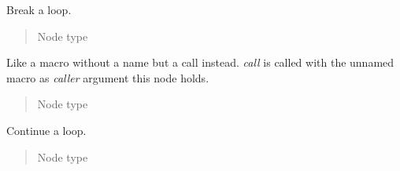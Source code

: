 \documentclass[a4paper,10pt,english]{sphinxmanual}
\begin{document}
\begin{fulllineitems}
\label{extensions:jinja2.nodes.Break}
Break a loop.
\begin{quote}\begin{description}
\item[{Node type}] \leavevmode
{\hyperref[extensions:jinja2.nodes.Stmt]{}}

\end{description}\end{quote}

\end{fulllineitems}


\begin{fulllineitems}
\label{extensions:jinja2.nodes.CallBlock}
Like a macro without a name but a call instead.  \emph{call} is called with
the unnamed macro as \emph{caller} argument this node holds.
\begin{quote}\begin{description}
\item[{Node type}] \leavevmode
{\hyperref[extensions:jinja2.nodes.Stmt]{}}

\end{description}\end{quote}

\end{fulllineitems}


\begin{fulllineitems}
\label{extensions:jinja2.nodes.Continue}
Continue a loop.
\begin{quote}\begin{description}
\item[{Node type}] \leavevmode
{\hyperref[extensions:jinja2.nodes.Stmt]{}}

\end{description}\end{quote}

\end{fulllineitems}

\end{document}
